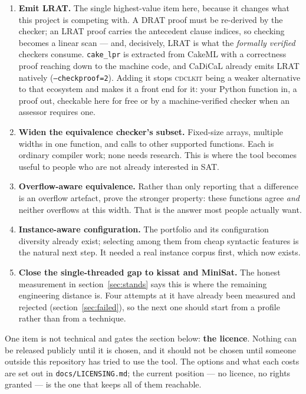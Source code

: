 \documentclass[11pt,a4paper]{article}
\newcommand{\cdclkit}{\textsc{cdclkit}}
\begin{document}
\begin{enumerate}[label=\arabic*.]
  \item \textbf{Emit LRAT.} The single highest-value item here, because it
        changes what this project is competing with. A DRAT proof must be
        re-derived by the checker; an LRAT proof carries the antecedent clause
        indices, so checking becomes a linear scan --- and, decisively, LRAT is
        what the \emph{formally verified} checkers consume. \texttt{cake\_lpr}
        is extracted from CakeML with a correctness proof reaching down to the
        machine code, and CaDiCaL already emits LRAT natively
        (\texttt{--checkproof=2}). Adding it stops \cdclkit{} being a weaker
        alternative to that ecosystem and makes it a front end for it: your
        Python function in, a proof out, checkable here for free or by a
        machine-verified checker when an assessor requires one.
  \item \textbf{Widen the equivalence checker's subset.} Fixed-size arrays,
        multiple widths in one function, and calls to other supported
        functions. Each is ordinary compiler work; none needs research. This is
        where the tool becomes useful to people who are not already interested
        in SAT.
  \item \textbf{Overflow-aware equivalence.} Rather than only reporting that a
        difference is an overflow artefact, prove the stronger property: these
        functions agree \emph{and} neither overflows at this width. That is the
        answer most people actually want.
  \item \textbf{Instance-aware configuration.} The portfolio and its
        configuration diversity already exist; selecting among them from cheap
        syntactic features is the natural next step. It needed a real instance
        corpus first, which now exists.
  \item \textbf{Close the single-threaded gap to kissat and MiniSat.} The
        honest measurement in section~\ref{sec:stands} says this is where the remaining
        engineering distance is. Four attempts at it have already been
        measured and rejected (section~\ref{sec:failed}), so the next one should start from a
        profile rather than from a technique.
\end{enumerate}

\noindent
One item is not technical and gates the section below: \textbf{the licence}.
Nothing can be released publicly until it is chosen, and it should not be
chosen until someone outside this repository has tried to use the tool. The
options and what each costs are set out in \texttt{docs/LICENSING.md}; the
current position --- no licence, no rights granted --- is the one that keeps
all of them reachable.
\end{document}
